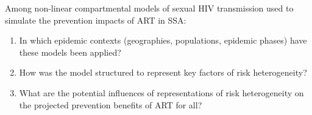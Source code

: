 Among non-linear compartmental models of sexual HIV transmission
used to simulate the prevention impacts of ART in SSA:
\begin{enumerate}
\item\label{rq:1}
      In which epidemic contexts (geographies, populations, epidemic phases)
      have these models been applied?
\item\label{rq:2}
      How was the model structured to represent key factors of risk heterogeneity?
\item\label{rq:3}
      What are the potential influences of representations of risk heterogeneity
      on the projected prevention benefits of ART for all?
\end{enumerate}